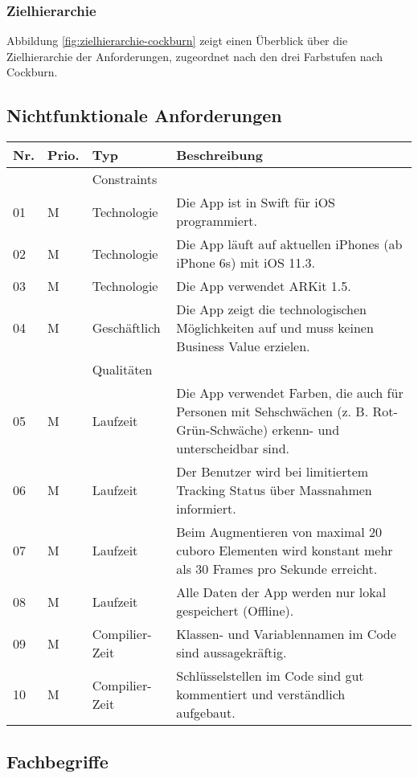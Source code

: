 \subsubsection{Zielhierarchie}
Abbildung \ref{fig:zielhierarchie-cockburn} zeigt einen Überblick über die Zielhierarchie der Anforderungen, zugeordnet nach den drei Farbstufen nach Cockburn.

\subsection{Nichtfunktionale Anforderungen}\label{appendix:nichtfunktionale-anforderungen}

\begin{longtable}{l l l p{10cm}}
	\hline
	\textbf{Nr.} & \textbf{Prio.} & \textbf{Typ} & \textbf{Beschreibung} \\
	\hline
	 & & Constraints & \\
	\hline
	01 & M & Technologie & Die App ist in Swift für iOS programmiert. \\
	02 & M & Technologie & Die App läuft auf aktuellen iPhones (ab iPhone 6s) mit iOS 11.3. \\
	03 & M & Technologie & Die App verwendet ARKit 1.5. \\
	04 & M & Geschäftlich & Die App zeigt die technologischen Möglichkeiten auf und muss keinen Business Value erzielen. \\
	\hline
	 & & Qualitäten & \\
	\hline
	05 & M & Laufzeit & Die App verwendet Farben, die auch für Personen mit Sehschwächen (z. B. Rot-Grün-Schwäche) erkenn- und unterscheidbar sind. \\ 
	06 & M & Laufzeit & Der Benutzer wird bei limitiertem Tracking Status über Massnahmen informiert. \\
	07 & M & Laufzeit & Beim Augmentieren von maximal 20 cuboro Elementen wird konstant mehr als 30 Frames pro Sekunde erreicht. \\
	08 & M & Laufzeit & Alle Daten der App werden nur lokal gespeichert (Offline). \\
	09 & M & Compilier-Zeit & Klassen- und Variablennamen im Code sind aussagekräftig. \\
	10 & M & Compilier-Zeit & Schlüsselstellen im Code sind gut kommentiert und verständlich aufgebaut. \\
	\hline
\end{longtable}

\subsection{Fachbegriffe}

